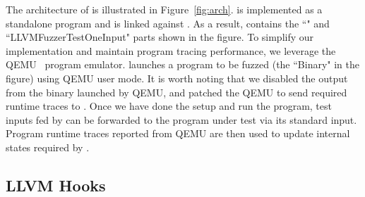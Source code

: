 The architecture of \sys is illustrated in Figure~\ref{fig:arch}.
\sys is implemented as a standalone program and is linked against \libfuzzer.
As a result, \sys contains the ``\libfuzzer" and ``LLVMFuzzerTestOneInput" parts shown in the figure.
To simplify our implementation and maintain program tracing performance, we leverage the QEMU~\cite{qemu} program emulator.
\sys launches a program to be fuzzed (the ``Binary" in the figure) using QEMU user mode.
It is worth noting that we disabled the output from the binary launched by QEMU, and patched the QEMU to send required runtime traces to \sys.
%
Once we have done the setup and run the program, test inputs fed by \libfuzzer can be forwarded to the program under test via its standard input.
Program runtime traces reported from QEMU are then used to update internal states required by \libfuzzer.

\subsection{LLVM Hooks}
\label{lbl:hooks}

